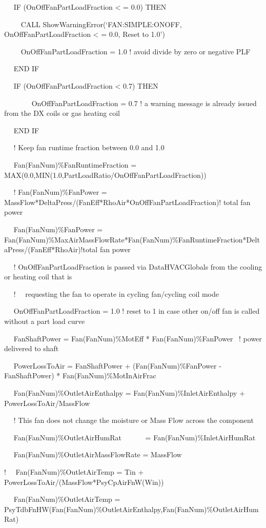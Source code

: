 ~~ IF (OnOffFanPartLoadFraction \textless{} = 0.0) THEN

~~~~ CALL ShowWarningError(`FAN:SIMPLE:ONOFF, OnOffFanPartLoadFraction \textless{} = 0.0, Reset to 1.0')

~~~~ OnOffFanPartLoadFraction = 1.0 ! avoid divide by zero or negative PLF

~~ END IF

~~ IF (OnOffFanPartLoadFraction \textless{} 0.7) THEN

~~~~~~~ OnOffFanPartLoadFraction = 0.7 ! a warning message is already issued from the DX coils or gas heating coil

~~ END IF

~~ ! Keep fan runtime fraction between 0.0 and 1.0

~~ Fan(FanNum)\%FanRuntimeFraction = MAX(0.0,MIN(1.0,PartLoadRatio/OnOffFanPartLoadFraction))

~~ ! Fan(FanNum)\%FanPower = MassFlow*DeltaPress/(FanEff*RhoAir*OnOffFanPartLoadFraction)! total fan power

~~ Fan(FanNum)\%FanPower = Fan(FanNum)\%MaxAirMassFlowRate*Fan(FanNum)\%FanRuntimeFraction*DeltaPress/(FanEff*RhoAir)!total fan power

~~ ! OnOffFanPartLoadFraction is passed via DataHVACGlobals from the cooling or heating coil that is

~~ !~~ requesting the fan to operate in cycling fan/cycling coil mode

~~ OnOffFanPartLoadFraction = 1.0 ! reset to 1 in case other on/off fan is called without a part load curve

~~ FanShaftPower = Fan(FanNum)\%MotEff * Fan(FanNum)\%FanPower~ ! power delivered to shaft

~~ PowerLossToAir = FanShaftPower + (Fan(FanNum)\%FanPower - FanShaftPower) * Fan(FanNum)\%MotInAirFrac

~~ Fan(FanNum)\%OutletAirEnthalpy = Fan(FanNum)\%InletAirEnthalpy + PowerLossToAir/MassFlow

~~ ! This fan does not change the moisture or Mass Flow across the component

~~ Fan(FanNum)\%OutletAirHumRat~~~~~~ = Fan(FanNum)\%InletAirHumRat

~~ Fan(FanNum)\%OutletAirMassFlowRate = MassFlow

!~~ Fan(FanNum)\%OutletAirTemp = Tin + PowerLossToAir/(MassFlow*PsyCpAirFnW(Win))

~~ Fan(FanNum)\%OutletAirTemp = PsyTdbFnHW(Fan(FanNum)\%OutletAirEnthalpy,Fan(FanNum)\%OutletAirHumRat)


